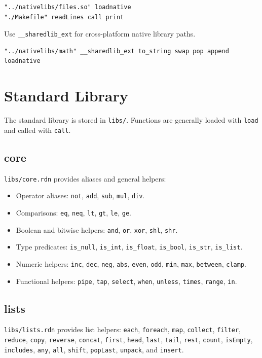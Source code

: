 \documentclass[11pt,a4paper]{article}
\newcommand{\code}[1]{\texttt{#1}}
\begin{document}
\begin{lstlisting}[language=Raden]
"../nativelibs/files.so" loadnative
"./Makefile" readLines call print
\end{lstlisting}

Use \code{\_\_sharedlib\_ext} for cross-platform native library paths.

\begin{lstlisting}[language=Raden]
"../nativelibs/math" __sharedlib_ext to_string swap pop append loadnative
\end{lstlisting}

\section{Standard Library}

The standard library is stored in \code{libs/}. Functions are generally
loaded with \code{load} and called with \code{call}.

\subsection{core}

\code{libs/core.rdn} provides aliases and general helpers:

\begin{itemize}
\item Operator aliases: \code{not}, \code{add}, \code{sub}, \code{mul}, \code{div}.
\item Comparisons: \code{eq}, \code{neq}, \code{lt}, \code{gt}, \code{le}, \code{ge}.
\item Boolean and bitwise helpers: \code{and}, \code{or}, \code{xor}, \code{shl}, \code{shr}.
\item Type predicates: \code{is\_null}, \code{is\_int}, \code{is\_float}, \code{is\_bool}, \code{is\_str}, \code{is\_list}.
\item Numeric helpers: \code{inc}, \code{dec}, \code{neg}, \code{abs}, \code{even}, \code{odd}, \code{min}, \code{max}, \code{between}, \code{clamp}.
\item Functional helpers: \code{pipe}, \code{tap}, \code{select}, \code{when}, \code{unless}, \code{times}, \code{range}, \code{in}.
\end{itemize}

\subsection{lists}

\code{libs/lists.rdn} provides list helpers:
\code{each}, \code{foreach}, \code{map}, \code{collect}, \code{filter},
\code{reduce}, \code{copy}, \code{reverse}, \code{concat}, \code{first},
\code{head}, \code{last}, \code{tail}, \code{rest}, \code{count},
\code{isEmpty}, \code{includes}, \code{any}, \code{all}, \code{shift},
\code{popLast}, \code{unpack}, and \code{insert}.
\end{document}
